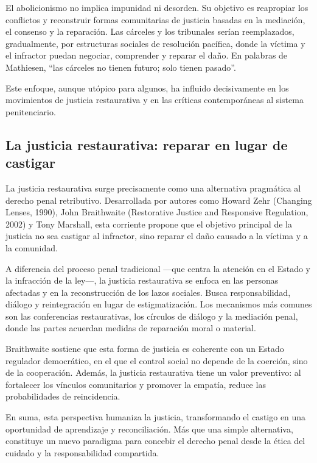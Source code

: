 \documentclass[
  spanish,
  letterpaper,
  DIV=11,
  numbers=noendperiod]{scrreprt}
\begin{document}
El abolicionismo no implica impunidad ni desorden. Su objetivo es
reapropiar los conflictos y reconstruir formas comunitarias de justicia
basadas en la mediación, el consenso y la reparación. Las cárceles y los
tribunales serían reemplazados, gradualmente, por estructuras sociales
de resolución pacífica, donde la víctima y el infractor puedan negociar,
comprender y reparar el daño. En palabras de Mathiesen, ``las cárceles
no tienen futuro; solo tienen pasado''.

Este enfoque, aunque utópico para algunos, ha influido decisivamente en
los movimientos de justicia restaurativa y en las críticas
contemporáneas al sistema penitenciario.

\subsection{La justicia restaurativa: reparar en lugar de
castigar}\label{la-justicia-restaurativa-reparar-en-lugar-de-castigar}

La justicia restaurativa surge precisamente como una alternativa
pragmática al derecho penal retributivo. Desarrollada por autores como
Howard Zehr (Changing Lenses, 1990), John Braithwaite (Restorative
Justice and Responsive Regulation, 2002) y Tony Marshall, esta corriente
propone que el objetivo principal de la justicia no sea castigar al
infractor, sino reparar el daño causado a la víctima y a la comunidad.

A diferencia del proceso penal tradicional ---que centra la atención en
el Estado y la infracción de la ley---, la justicia restaurativa se
enfoca en las personas afectadas y en la reconstrucción de los lazos
sociales. Busca responsabilidad, diálogo y reintegración en lugar de
estigmatización. Los mecanismos más comunes son las conferencias
restaurativas, los círculos de diálogo y la mediación penal, donde las
partes acuerdan medidas de reparación moral o material.

Braithwaite sostiene que esta forma de justicia es coherente con un
Estado regulador democrático, en el que el control social no depende de
la coerción, sino de la cooperación. Además, la justicia restaurativa
tiene un valor preventivo: al fortalecer los vínculos comunitarios y
promover la empatía, reduce las probabilidades de reincidencia.

En suma, esta perspectiva humaniza la justicia, transformando el castigo
en una oportunidad de aprendizaje y reconciliación. Más que una simple
alternativa, constituye un nuevo paradigma para concebir el derecho
penal desde la ética del cuidado y la responsabilidad compartida.
\end{document}
